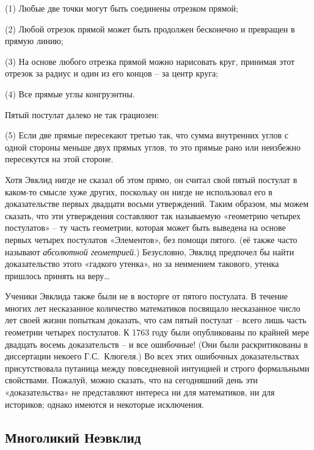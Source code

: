 \documentclass[../main.tex]{subfiles}
\begin{document}
(1) Любые две точки могут быть соединены отрезком прямой;

(2) Любой отрезок прямой может быть продолжен бесконечно и превращен в прямую линию;

(3) На основе любого отрезка прямой можно нарисовать круг, принимая этот отрезок за радиус и один из его концов \--- за центр круга;

(4) Все прямые углы конгруэнтны.

Пятый постулат далеко не так грациозен:

(5) Если две прямые пересекают третью так, что сумма внутренних углов с одной стороны меньше двух прямых углов, то это прямые рано или неизбежно пересекутся на этой стороне.

Хотя Эвклид нигде не сказал об этом прямо, он считал свой пятый постулат в каком-то смысле хуже других, поскольку он нигде не использовал его в доказательстве первых двадцати восьми утверждений. Таким образом, мы можем сказать, что эти утверждения составляют так называемую «геометрию четырех постулатов» \--- ту часть геометрии, которая может быть выведена на основе первых четырех постулатов «Элементов», без помощи пятого. (её также часто называют \emph{абсолютной геометрией}.) Безусловно, Эвклид предпочел бы найти доказательство этого «гадкого утенка», но за неимением такового, утенка пришлось принять на веру\ldots{}

Ученики Эвклида также были не в восторге от пятого постулата. В течение многих лет несказанное количество математиков посвящало несказанное число лет своей жизни попыткам доказать, что сам пятый постулат \--- всего лишь часть геометрии четырех постулатов. К 1763 году были опубликованы по крайней мере двадцать восемь доказательств \--- и все ошибочные! (Они были раскритикованы в диссертации некоего Г.С.~Клюгеля.) Во всех этих ошибочных доказательствах присутствовала путаница между повседневной интуицией и строго формальными свойствами. Пожалуй, можно сказать, что на сегодняшний день эти «доказательства» не представляют интереса ни для математиков, ни для историков; однако имеются и некоторые исключения.


\subsection{Многоликий Неэвклид}
\end{document}

